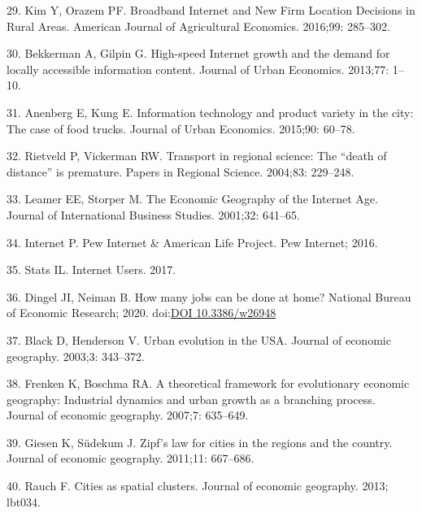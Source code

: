 \documentclass[10pt,letterpaper]{article}
\begin{document}
\leavevmode\hypertarget{ref-kim_broadband_2016}{}%
29. Kim Y, Orazem PF. Broadband Internet and New Firm Location Decisions
in Rural Areas. American Journal of Agricultural Economics. 2016;99:
285--302.

\leavevmode\hypertarget{ref-bekkerman_high-speed_2013}{}%
30. Bekkerman A, Gilpin G. High-speed Internet growth and the demand for
locally accessible information content. Journal of Urban Economics.
2013;77: 1--10.

\leavevmode\hypertarget{ref-anenberg_information_2015}{}%
31. Anenberg E, Kung E. Information technology and product variety in
the city: The case of food trucks. Journal of Urban Economics. 2015;90:
60--78.

\leavevmode\hypertarget{ref-rietveld_transport_2004}{}%
32. Rietveld P, Vickerman RW. Transport in regional science: The ``death
of distance'' is premature. Papers in Regional Science. 2004;83:
229--248.

\leavevmode\hypertarget{ref-edward_e_leamer_economic_2001}{}%
33. Leamer EE, Storper M. The Economic Geography of the Internet Age.
Journal of International Business Studies. 2001;32: 641--65.

\leavevmode\hypertarget{ref-pew_internet_pew_2016}{}%
34. Internet P. Pew Internet \& American Life Project. Pew Internet;
2016.

\leavevmode\hypertarget{ref-internet_live_stats_internet_2017}{}%
35. Stats IL. Internet Users. 2017.

\leavevmode\hypertarget{ref-dingel2020many}{}%
36. Dingel JI, Neiman B. How many jobs can be done at home? National
Bureau of Economic Research; 2020.
doi:\href{https://doi.org/DOI\%2010.3386/w26948}{DOI 10.3386/w26948}

\leavevmode\hypertarget{ref-black_urban_2003}{}%
37. Black D, Henderson V. Urban evolution in the USA. Journal of
economic geography. 2003;3: 343--372.

\leavevmode\hypertarget{ref-frenken_theoretical_2007}{}%
38. Frenken K, Boschma RA. A theoretical framework for evolutionary
economic geography: Industrial dynamics and urban growth as a branching
process. Journal of economic geography. 2007;7: 635--649.

\leavevmode\hypertarget{ref-giesen_zipfs_2011}{}%
39. Giesen K, Südekum J. Zipf's law for cities in the regions and the
country. Journal of economic geography. 2011;11: 667--686.

\leavevmode\hypertarget{ref-rauch_cities_2013}{}%
40. Rauch F. Cities as spatial clusters. Journal of economic geography.
2013; lbt034.
\end{document}
